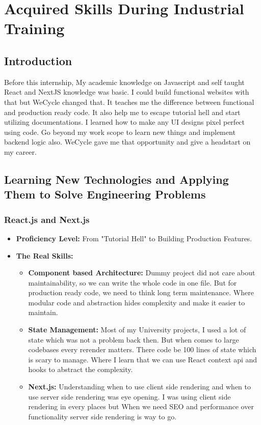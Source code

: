 \chapter{Acquired Skills During Industrial Training}
\label{chapter-4}

\section{Introduction}

\par Before this internship, My academic knowledge on Javascript and self taught React and NextJS knowledge was basic. I could build functional websites with that but WeCycle changed that. It teaches me the difference between functional and production ready code. It also help me to escape tutorial hell and start utilizing documentations. I learned how to make any UI designs pixel perfect using code. Go beyond my work scope to learn new things and implement backend logic also. WeCycle gave me that opportunity and give a headstart on my career.

\section{Learning New Technologies and Applying Them to Solve
Engineering Problems}

\subsection{React.js and Next.js \cite{reactlearn2024, nextjsdocs2024}}
\begin{itemize}
    \item \textbf{Proficiency Level:} From "Tutorial Hell" to Building Production Features.
    \item \textbf{The Real Skills:}
    \begin{itemize}
        \item \textbf{Component based Architecture:} Dummy project did not care about maintainability, so we can write the whole code in one file. But for production ready code, we need to think long term maintenance. Where modular code and abstraction hides complexity and make it easier to maintain.
        \item \textbf{State Management:} Most of my University projects, I used a lot of state which was not a problem back then. But when comes to large codebases every rerender matters. There code be 100 lines of state which is scary to manage. Where I learn that we can use React context api and hooks to abstract the complexity.
        \item \textbf{Next.js:} Understanding when to use client side rendering and when to use server side rendering was eye opening. I was using client side rendering in every places but When we need SEO and performance over functionality server side rendering is way to go.
    \end{itemize}
\end{itemize}

